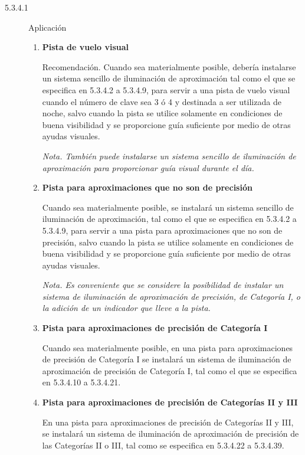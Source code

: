 \begin{tcolorbox}[title={Requerimientos OACI. Anexo 14. Volumen I. Edición 2018.
    }]
{\footnotesize
  \begin{description}
  \item [5.3.4.1]  Aplicación
    \begin{enumerate}[A ]
    \item {\bf Pista de vuelo visual}
      
      Recomendación. Cuando sea materialmente posible, debería instalarse un sistema sencillo de iluminación de aproximación tal como el que se especifica en 5.3.4.2 a 5.3.4.9, para servir a una pista de vuelo visual cuando el número de clave sea 3 ó 4 y destinada a ser utilizada de noche, salvo cuando la pista se utilice solamente en condiciones de buena visibilidad y se proporcione guía suficiente por medio de otras ayudas visuales.
      
{\it Nota. También puede instalarse un sistema sencillo de iluminación de aproximación para proporcionar guía visual
  durante el día.}

\item {\bf  Pista para aproximaciones que no son de precisión}
  
Cuando sea materialmente posible, se instalará un sistema sencillo de iluminación de aproximación, tal como el que se
especifica en 5.3.4.2 a 5.3.4.9, para servir a una pista para aproximaciones que no son de precisión, salvo cuando la pista se
utilice solamente en condiciones de buena visibilidad y se proporcione guía suficiente por medio de otras ayudas visuales.

\emph{Nota. Es conveniente que se considere la posibilidad de instalar un sistema de iluminación de aproximación de
precisión, de Categoría I, o la adición de un indicador que lleve a la pista.}

\item \textbf{ Pista para aproximaciones de precisión de Categoría I}
  
Cuando sea materialmente posible, en una pista para aproximaciones de precisión de Categoría I se instalará un sistema de
iluminación de aproximación de precisión de Categoría I, tal como el que se especifica en 5.3.4.10 a 5.3.4.21.

\item \textbf{ Pista para aproximaciones de precisión de Categorías II y III}
  
En una pista para aproximaciones de precisión de Categorías II y III, se instalará un sistema de iluminación de
aproximación de precisión de las Categorías II o III, tal como se especifica en 5.3.4.22 a 5.3.4.39.


\end{enumerate}
\end{description}
}
\end{tcolorbox}




